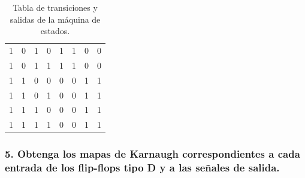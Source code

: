 \documentclass[12pt, letterpaper]{article}
\begin{document}
\begin{tcolorbox}[colback=gray!20,colframe=LimeGreen!75!black]
\begin{table}[H]
\begin{center}
\begin{tabular}{|cc|cc|cc|cc|}
        1 & 0 & 1 & 0 & 1 & 1 & \cellcolor{ForestGreen!90}0 & \cellcolor{ForestGreen!90}0 \\
        1 & 0 & 1 & 1 & 1 & 1 & \cellcolor{ForestGreen!90}0 & \cellcolor{ForestGreen!90}0 \\
        \hline
        1 & 1 & 0 & 0 & 0 & 0 & \cellcolor{ForestGreen!90}1 & \cellcolor{ForestGreen!90}1 \\
        1 & 1 & 0 & 1 & 0 & 0 & \cellcolor{ForestGreen!90}1 & \cellcolor{ForestGreen!90}1 \\
        1 & 1 & 1 & 0 & 0 & 0 & \cellcolor{ForestGreen!90}1 & \cellcolor{ForestGreen!90}1 \\
        1 & 1 & 1 & 1 & 0 & 0 & \cellcolor{ForestGreen!90}1 & \cellcolor{ForestGreen!90}1 \\
        \hline
        \end{tabular}
    \end{center}
    \caption{Tabla de transiciones y salidas de la máquina de estados.}
    \label{tab:tabla_transiciones_estados_salidas}
    \end{table}
\end{tcolorbox}

\subsubsection*{5. Obtenga los mapas de Karnaugh correspondientes a cada entrada de los flip-flops tipo D y a las señales de salida.}
\end{document}
